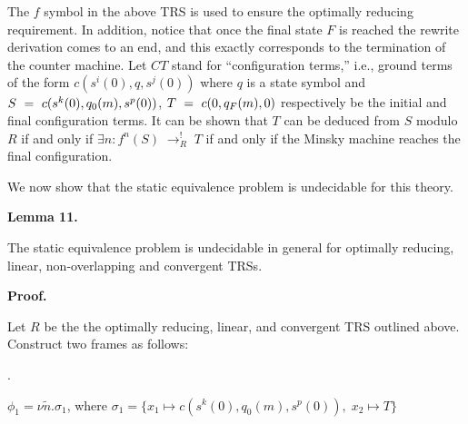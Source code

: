 \documentclass[10pt,a4paper]{amsart}
\begin{document}
 
The $f$ symbol in the above TRS is used to ensure the optimally reducing requirement. In addition, notice that once the final state $F$ is reached the rewrite derivation comes to an end, and this exactly corresponds to the termination of the counter machine. Let $CT$ stand for “configuration terms,” i.e., ground terms of the form $c(s^{i}(0),q,s^{j}(0))$ where $q$ is a state symbol and $S\leavevmode\nobreak\ =\leavevmode\nobreak\ c(s^{k}(0),q_{0}(m),s^{p}(0))$, $T\leavevmode\nobreak\ =\leavevmode\nobreak\ c(0,q_{F}(m),0)$ respectively be the initial and final configuration terms. It can be shown that $T$ can be deduced from $S$ modulo $R$ if and only if $\exists n:f^{n}(S)\;\rightarrow_{R}^{!}\;T$ if and only if the Minsky machine reaches the final configuration.\par
 
 
 
We now show that the static equivalence problem is undecidable for this theory.\par
 
 
 
\par\medskip\noindent\textbf{Lemma 11.}\par
 
 
The static equivalence problem is undecidable in general for optimally reducing, linear, non-overlapping and convergent TRSs.\par
 
 
 
 
\par\medskip\noindent\textbf{Proof.}\par
 
 
Let $R$ be the the optimally reducing, linear, and convergent TRS outlined above. Construct two frames as follows:\par
  
\par{}. 
 
$\phi_{1}=\nu\tilde{n}.\sigma_{1}$, where $\sigma_{1}=\{x_{1}\mapsto c(s^{k}(0),q_{0}(m),s^{p}(0)),\;x_{2}\mapsto T\}$\par
 
\end{document}
